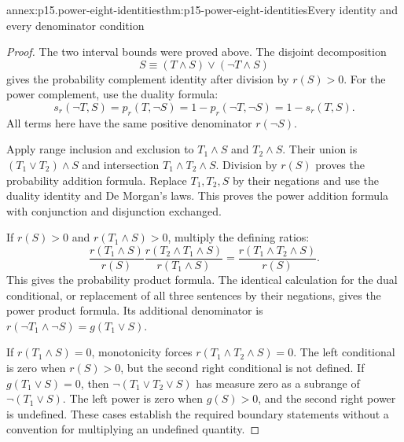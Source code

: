 \begin{annexitem}{annex:p15.power-eight-identities}{thm:p15-power-eight-identities}{Every identity and every denominator condition}
\begin{proof}
The two interval bounds
were proved above.
The disjoint decomposition
\[
 S\equiv(T\land S)\lor(\neg T\land S)
\]
gives the probability
complement identity after
division by \(r(S)>0\).
For the power complement,
use the duality formula:
\[
 s_r(\neg T,S)=p_r(T,\neg S)
              =1-p_r(\neg T,\neg S)
              =1-s_r(T,S).
\]
All terms here have
the same positive
denominator \(r(\neg S)\).

Apply range inclusion
and exclusion to
\(T_1\land S\) and
\(T_2\land S\).
Their union is
\((T_1\lor T_2)\land S\)
and intersection
\(T_1\land T_2\land S\).
Division by \(r(S)\)
proves the probability
addition formula.
Replace \(T_1,T_2,S\)
by their negations and
use the duality identity
and De Morgan's laws.
This proves the power
addition formula with
conjunction and disjunction
exchanged.

If \(r(S)>0\) and
\(r(T_1\land S)>0\),
multiply the defining ratios:
\[
 \frac{r(T_1\land S)}{r(S)}
 \frac{r(T_2\land T_1\land S)}{r(T_1\land S)}
 =\frac{r(T_1\land T_2\land S)}{r(S)}.
\]
This gives the probability
product formula.
The identical calculation
for the dual conditional,
or replacement of all
three sentences by
their negations, gives
the power product formula.
Its additional denominator
is \(r(\neg T_1\land\neg S)
=g(T_1\lor S)\).

If \(r(T_1\land S)=0\),
monotonicity forces
\(r(T_1\land T_2\land S)=0\).
The left conditional
is zero when \(r(S)>0\),
but the second right
conditional is not defined.
If \(g(T_1\lor S)=0\),
then
\(\neg(T_1\lor T_2\lor S)\)
has measure zero as
a subrange of
\(\neg(T_1\lor S)\).
The left power is zero
when \(g(S)>0\),
and the second right
power is undefined.
These cases establish
the required boundary
statements without a
convention for multiplying
an undefined quantity.
\end{proof}
\end{annexitem}

